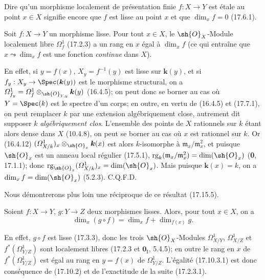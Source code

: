 Dire qu'un morphisme localement de présentation finie $f:X\to Y$ est étale au point $x\in X$ signifie encore que $f$ est lisse au point $x$ et que $\dim_x f=0$ (17.6.1).

\begin{proposition}[17.10.2]
\label{IV.17.10.2}
Soit $f:X\to Y$ un morphisme lisse. Pour tout $x\in X$, le $\sh{O}_X$-Module localement libre $\varOmega_f^1$ \textup{(17.2.3)} a un rang en $x$ égal à $\dim_x f$ \textup{(ce qui entraîne que $x\leadsto\dim_x f$ est une fonction \emph{continue} dans $X$)}.
\end{proposition}

En effet, si $y=f(x)$, $X_y=f^{-1}(y)$ est lisse sur $\boldsymbol{k}(y)$, et si $f_y:X_y\to\Spec(\boldsymbol{k}(y))$ est le morphisme structural, on a $\varOmega_{f_y}^1=\varOmega_f^1\otimes_{\sh{O}_{Y,y}}\boldsymbol{k}(y)$ (16.4.5); on peut donc se borner au cas où $Y=\Spec(k)$ est le spectre d'un corps; en outre, en vertu de (16.4.5) et (17.7.1), on peut remplacer $k$ par une extension algébriquement close, autrement dit
supposer $k$ \emph{algébriquement clos}. L'ensemble des points de $X$ rationnels sur $k$ étant alors dense dans $X$ (10.4.8), on peut se borner au cas où $x$ est rationnel sur $k$. Or (16.4.12) $(\varOmega^1_{X/k})_x\otimes_{\sh{O}_x}\boldsymbol{k}(x)$ est alors $k$-isomorphe à $\mathfrak m_x/\mathfrak m_x^2$, et puisque $\sh{O}_x$ est un anneau local régulier (17.5.1), $\operatorname{rg}_k(\mathfrak m_x/\mathfrak m_x^2)=\dim(\sh{O}_x)$ (\textbf{0}, 17.1.1); donc $\operatorname{rg}_{\sh{O}_x}(\varOmega^1_{X/k})_x=\dim(\sh{O}_x)$. Mais puisque $\boldsymbol{k}(x)=k$, on a $\dim_x f=\dim(\sh{O}_x)$ (5.2.3). C.Q.F.D.

Nous démontrerons plus loin une réciproque de ce résultat (17.15.5).

\begin{corollary}[17.10.3]
\label{IV.17.10.3}
Soient $f:X\to Y$, $g:Y\to Z$ deux morphismes lisses. Alors, pour tout $x\in X$, on a
\begin{equation}
\label{IV.17.10.3.1}
\tag{17.10.3.1}
\dim_x(g\circ f)=\dim_x f+\dim_{f(x)}g.
\end{equation}
\end{corollary}

En effet, $g\circ f$ est lisse (17.3.3), donc les trois $\sh{O}_X$-Modules $\varOmega^1_{X/Y}$, $\varOmega^1_{X/Z}$ et $f^*(\varOmega^1_{Y/Z})$ sont localement libres (17.2.3 et $\mathbf{0}_{\mathrm I}$, 5.4.5); en outre le rang en $x$ de $f^*(\varOmega^1_{Y/Z})$ est égal au rang en $y=f(x)$ de $\varOmega^1_{Y/Z}$. L'égalité (17.10.3.1) est donc conséquence de (17.10.2) et de l'exactitude de la suite (17.2.3.1).

